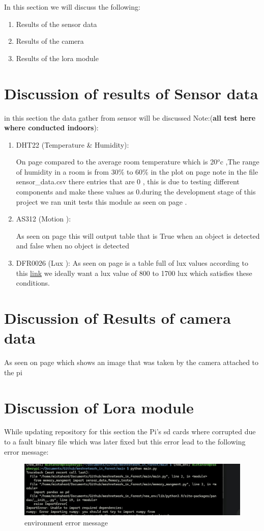 In this section we will discuss the following:
\begin{enumerate}
    \item Results of the sensor data
    \item Results of the camera
    \item Results of the lora module
\end{enumerate}
\section{Discussion of results of Sensor data}
in this section the data gather from sensor will be discussed Note:(\textbf{all test here where conducted indoors}):
\begin{enumerate}
    \item DHT22 (Temperature \& Humidity):

    On page \pageref{Recorded data from  DHT22 on the 5th of march} compared to the average room temperature which is  20$^o$c ,The range of humidity in a room is from 30\% to 60\% in the plot on page \pageref{Temperature and Humidity plotted overtime} note in the file sensor\_data.csv there entries  that are 0 , this is due to  testing different components and make these values as  0.during the development stage of this project we ran unit tests  this module as seen on page \pageref{unit test message for DHT22 module}.
    \item AS312 (Motion ):

    As seen on page \pageref{Recorded data from AS312 on the \today} this will output table that is True when an object is detected and  false when no object is  detected

    \item DFR0026 (Lux ):
    As seen on page \pageref{Recorded data from DFR0026 on the 25th of march 2024} is a table full of  lux values according to  this \href{https://www.thoughtco.com/lighting-levels-by-room-1206643}{link} we ideally want a lux value  of  800 to 1700 lux which satisfies these conditions.
\end{enumerate}
\section{Discussion of Results of camera data}
As seen on page \pageref{A photo from 25th of march 2024} which shows  an image that was taken by the camera  attached to  the pi
\section{Discussion of Lora module}
\label{Discussion of Lora module}
While updating repository for this section the Pi's sd cards where corrupted due to  a fault binary file which was  later fixed  but  this error lead to the following error message:

\begin{figure}[h!]
    \centering
    \includegraphics[width=0.5\linewidth]{Images/error_message.jpeg}
    \caption{environment error message}
    \label{environment error message}
\end{figure}